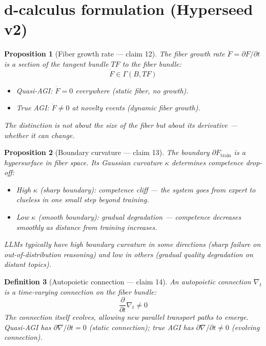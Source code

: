 \documentclass[11pt,a4paper]{article}
\newtheorem{definition}{Definition}[section]
\newtheorem{proposition}[definition]{Proposition}
\begin{document}
\section{d-calculus formulation (Hyperseed v2)}

\begin{proposition}[Fiber growth rate --- claim 12]
\label{prop:growth-rate}
The fiber growth rate $\dot{F} = \partial F / \partial t$ is a section of
the tangent bundle $TF$ to the fiber bundle:
\[
  \dot{F} \in \Gamma(B, TF)
\]
\begin{itemize}
  \item Quasi-AGI: $\dot{F} = 0$ everywhere (static fiber, no growth).
  \item True AGI: $\dot{F} \neq 0$ at novelty events (dynamic fiber growth).
\end{itemize}
The distinction is not about the \emph{size} of the fiber but about its
\emph{derivative} --- whether it can change.
\end{proposition}

\begin{proposition}[Boundary curvature --- claim 13]
\label{prop:boundary}
The boundary $\partial F_{\text{train}}$ is a hypersurface in fiber space.
Its Gaussian curvature $\kappa$ determines competence drop-off:
\begin{itemize}
  \item High $\kappa$ (sharp boundary): competence cliff --- the system
    goes from expert to clueless in one small step beyond training.
  \item Low $\kappa$ (smooth boundary): gradual degradation --- competence
    decreases smoothly as distance from training increases.
\end{itemize}
LLMs typically have high boundary curvature in some directions (sharp
failure on out-of-distribution reasoning) and low in others (gradual
quality degradation on distant topics).
\end{proposition}

\begin{definition}[Autopoietic connection --- claim 14]
An \emph{autopoietic connection} $\nabla_t$ is a time-varying connection
on the fiber bundle:
\[
  \frac{\partial}{\partial t} \nabla_t \neq 0
\]
The connection itself evolves, allowing new parallel transport paths to
emerge. Quasi-AGI has $\partial \nabla / \partial t = 0$ (static connection);
true AGI has $\partial \nabla / \partial t \neq 0$ (evolving connection).
\end{definition}
\end{document}

